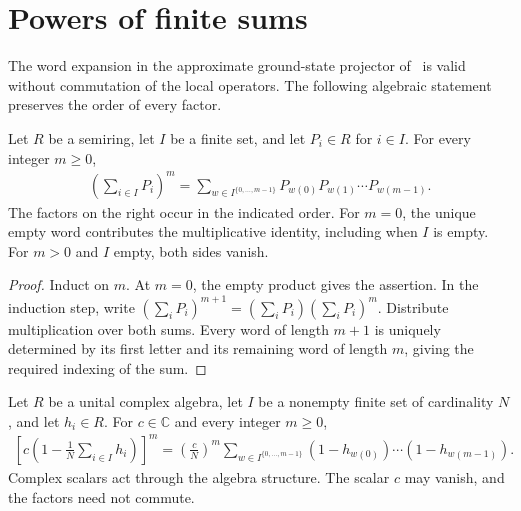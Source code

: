 \section{Powers of finite sums}
\label{sec:finite_sum_powers}

The word expansion in the approximate ground-state projector of~\cite{Landau2013PolynomialTime} is valid without
commutation of the local operators. The following algebraic statement
preserves the order of every factor.

\begin{theorem}
    \label{thm:finite_sum_power_ordered_words}
    \leanok
    Let $R$ be a semiring, let $I$ be a finite set, and let $P_i\in R$
    for $i\in I$. For every integer $m\ge0$,
    \begin{align}
        \left(\sum_{i\in I}P_i\right)^m
        =\sum_{w\in I^{\{0,\ldots,m-1\}}}
            P_{w(0)}P_{w(1)}\cdots P_{w(m-1)}.
    \end{align}
    The factors on the right occur in the indicated order.
    For $m=0$, the unique empty word contributes the multiplicative identity,
    including when $I$ is empty. For $m>0$ and $I$ empty, both sides vanish.
\end{theorem}

\begin{proof}
    \leanok
    Induct on $m$. At $m=0$, the empty product gives the assertion.
    In the induction step, write
    $(\sum_i P_i)^{m+1}=(\sum_i P_i)(\sum_i P_i)^m$.
    Distribute multiplication over both sums. Every word of length $m+1$
    is uniquely determined by its first letter and its remaining word of
    length $m$, giving the required indexing of the sum.
\end{proof}

\begin{corollary}
    \label{cor:normalized_complement_ordered_words}
    \leanok
    Let $R$ be a unital complex algebra, let $I$ be a nonempty finite set
    of cardinality $N$, and let $h_i\in R$. For $c\in\mathbb C$ and every
    integer $m\ge0$,
    \begin{align}
        \left[c\left(1-\frac1N\sum_{i\in I}h_i\right)\right]^m
        =\left(\frac cN\right)^m
          \sum_{w\in I^{\{0,\ldots,m-1\}}}
            (1-h_{w(0)})\cdots(1-h_{w(m-1)}).
    \end{align}
    Complex scalars act through the algebra structure. The scalar $c$
    may vanish, and the factors need not commute.
\end{corollary}


